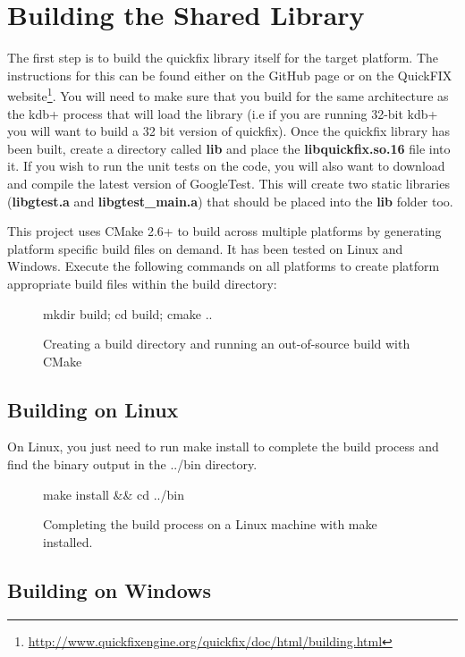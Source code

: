 \section{Building the Shared Library}

The first step is to build the quickfix library itself for the target platform. The instructions for this can be found either on the GitHub page or on the QuickFIX website\footnote{\url{http://www.quickfixengine.org/quickfix/doc/html/building.html}}. You will need to
make sure that you build for the same architecture as the kdb+ process that will load the library (i.e if you are running 32-bit kdb+ you will want to build a 32 bit version of quickfix). Once the quickfix library has been built, create a directory called \textbf{lib} and place the \textbf{libquickfix.so.16} file into it. If you wish to run the unit tests on the code, you will also want to download and compile the latest version of GoogleTest. This will create two static libraries (\textbf{libgtest.a} and \textbf{libgtest\_main.a}) that should be placed into the \textbf{lib} folder too.

This project uses CMake 2.6+ to build across multiple platforms by generating platform specific build files on demand. It has been tested on Linux and Windows. Execute the following commands on all platforms to create platform appropriate build files within the build directory:

\begin{figure}[H]
\begin{bashcode}
mkdir build; cd build; cmake ..
\end{bashcode}
\caption{Creating a build directory and running an out-of-source build with CMake}
\end{figure}

\subsection{Building on Linux}
On Linux, you just need to run make install to complete the build process and find the binary output in the ../bin directory.

\begin{figure}[H]
\begin{bashcode}
make install && cd ../bin
\end{bashcode}
\caption{Completing the build process on a Linux machine with make installed.}
\end{figure}

\subsection{Building on Windows}


